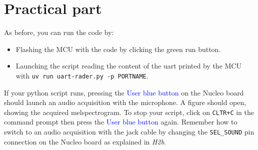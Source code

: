\section{Practical part}
%
As before, you can run the code by:
\begin{itemize}
	\item Flashing the MCU with the code by clicking the green run button.
	\item Launching the script reading the content of the uart printed by the MCU with \texttt{uv run uart-rader.py -p PORTNAME}.
\end{itemize}
If your python script runs, pressing the \textcolor{blue}{User blue button} on the Nucleo board should launch an audio acquisition with the microphone. A figure should open, showing the acquired melspectrogram. To stop your script, click on \texttt{CLTR+C} in the command prompt then press the \textcolor{blue}{User blue button} again.  Remember how to switch to an audio acquisition with the jack cable by changing the \texttt{SEL\_SOUND} pin connection on the Nucleo board as explained in \emph{H2b}.
%
